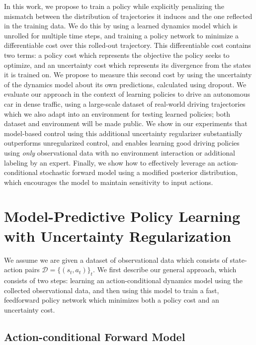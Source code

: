\documentclass{article} %
\begin{document}
In this work, we propose to train a policy while explicitly penalizing the mismatch between the distribution of trajectories it induces and the one reflected in the training data.
We do this by using a learned dynamics model which is unrolled for multiple time steps, and training a policy network to minimize a differentiable cost over this rolled-out trajectory.
This differentiable cost contains two terms: a policy cost which represents the objective the policy seeks to optimize, and an uncertainty cost which represents its divergence from the states it is trained on.
We propose to measure this second cost by using the uncertainty of the dynamics model about its own predictions, calculated using dropout.
We evaluate our approach in the context of learning policies to drive an autonomous car in dense traffic, using a large-scale dataset of real-world driving trajectories which we also adapt into an environment for testing learned policies; both dataset and environment will be made public.
We show in our experiments that model-based control using this additional uncertainty regularizer substantially outperforms unregularized control, and enables learning good driving policies using \emph{only} observational data with no environment interaction or additional labeling by an expert.
Finally, we show how to effectively leverage an action-conditional stochastic forward model using a modified posterior distribution, which encourages the model to maintain sensitivity to input actions. 


\section{Model-Predictive Policy Learning with Uncertainty Regularization}

We assume we are given a dataset of observational data which consists of state-action pairs $\mathcal{D} = \{(s_t, a_t)\}_t$.
We first describe our general approach, which consists of two steps: learning an action-conditional dynamics model using the collected observational data, and then using this model to train a fast, feedforward policy network which minimizes both a policy cost and an uncertainty cost.

\subsection{Action-conditional Forward Model}
\end{document}
